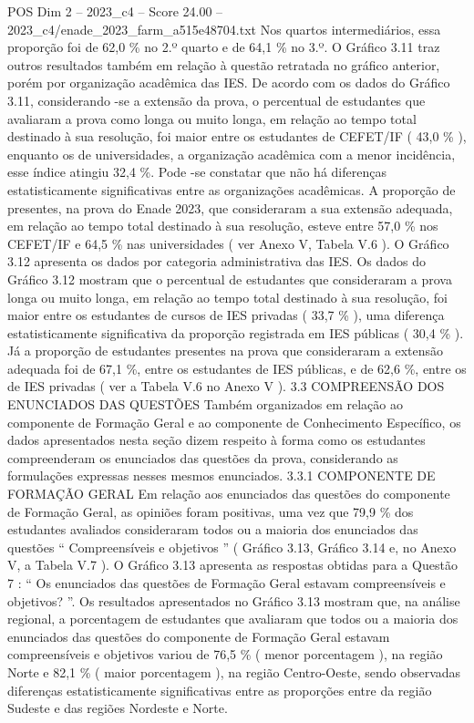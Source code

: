 \begin{textsample}{POS Dim 2 – 2023\_c4 – Score 24.00 – 2023\_c4/enade\_2023\_farm\_a515e48704.txt}
Nos quartos intermediários, essa proporção foi de 62,0 \% no 2.º quarto e de 64,1 \% no 3.º.
O Gráfico 3.11 traz outros resultados também em relação à questão retratada no gráfico anterior, porém por organização acadêmica das IES.
De acordo com os dados do Gráfico 3.11, considerando -se a extensão da prova, o percentual de estudantes que avaliaram a prova como longa ou muito longa, em relação ao tempo total destinado à sua resolução, foi maior entre os estudantes de CEFET/IF ( 43,0 \% ), enquanto os de universidades, a organização acadêmica com a menor incidência, esse índice atingiu 32,4 \%.
Pode -se constatar que não há diferenças estatisticamente significativas entre as organizações acadêmicas.
A proporção de presentes, na prova do Enade 2023, que consideraram a sua extensão adequada, em relação ao tempo total destinado à sua resolução, esteve entre 57,0 \% nos CEFET/IF e 64,5 \% nas universidades ( ver Anexo V, Tabela V.6 ).
O Gráfico 3.12 apresenta os dados por categoria administrativa das IES.
Os dados do Gráfico 3.12 mostram que o percentual de estudantes que consideraram a prova longa ou muito longa, em relação ao tempo total destinado à sua resolução, foi maior entre os estudantes de cursos de IES privadas ( 33,7 \% ), uma diferença estatisticamente significativa da proporção registrada em IES públicas ( 30,4 \% ).
Já a proporção de estudantes presentes na prova que consideraram a extensão adequada foi de 67,1 \%, entre os estudantes de IES públicas, e de 62,6 \%, entre os de IES privadas ( ver a Tabela V.6 no Anexo V ). 3.3 COMPREENSÃO DOS ENUNCIADOS DAS QUESTÕES Também organizados em relação ao componente de Formação Geral e ao componente de Conhecimento Específico, os dados apresentados nesta seção dizem respeito à forma como os estudantes compreenderam os enunciados das questões da prova, considerando as formulações expressas nesses mesmos enunciados. 3.3.1 COMPONENTE DE FORMAÇÃO GERAL Em relação aos enunciados das questões do componente de Formação Geral, as opiniões foram positivas, uma vez que 79,9 \% dos estudantes avaliados consideraram todos ou a maioria dos enunciados das questões “ Compreensíveis e objetivos ” ( Gráfico 3.13, Gráfico 3.14 e, no Anexo V, a Tabela V.7 ).
O Gráfico 3.13 apresenta as respostas obtidas para a Questão 7 : “ Os enunciados das questões de Formação Geral estavam compreensíveis e objetivos? ”.
Os resultados apresentados no Gráfico 3.13 mostram que, na análise regional, a porcentagem de estudantes que avaliaram que todos ou a maioria dos enunciados das questões do componente de Formação Geral estavam compreensíveis e objetivos variou de 76,5 \% ( menor porcentagem ), na região Norte e 82,1 \% ( maior porcentagem ), na região Centro-Oeste, sendo observadas diferenças estatisticamente significativas entre as proporções entre da região Sudeste e das regiões Nordeste e Norte.

\end{textsample}
